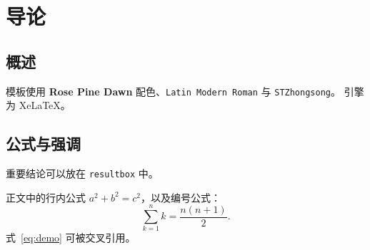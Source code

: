 \chapter{导论}
\label{ch:intro}

\section{概述}

模板使用 \textbf{Rose Pine Dawn} 配色、\texttt{Latin Modern Roman} 与 \texttt{STZhongsong}。
引擎为 XeLaTeX。

\section{公式与强调}

\begin{resultbox}
重要结论可以放在 \texttt{resultbox} 中。
\end{resultbox}

正文中的行内公式 $a^2 + b^2 = c^2$，以及编号公式：
\begin{equation}
  \label{eq:demo}
  \sum_{k=1}^{n} k = \frac{n(n+1)}{2}.
\end{equation}
式~\eqref{eq:demo} 可被交叉引用。
